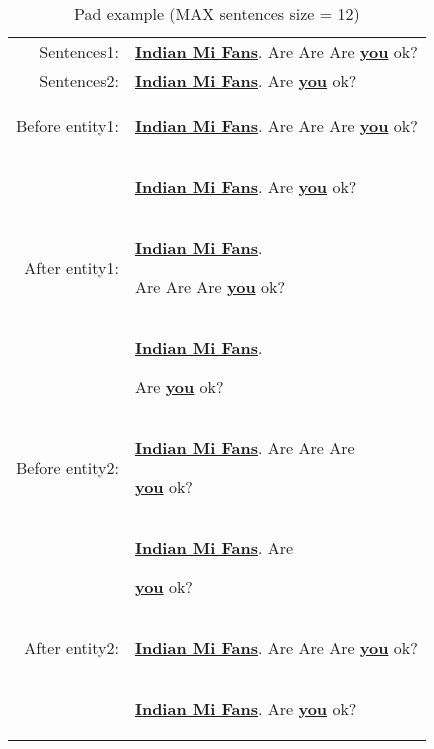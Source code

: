 \begin{table*}[htbp!] %
    \centering
    \begin{tabular}{rl}
    \midrule
        Sentences1:     &\textbf{\underline{Indian Mi Fans}}. Are Are Are \textbf{\underline{you}} ok? \\
        Sentences2:     &\textbf{\underline{Indian Mi Fans}}. Are \textbf{\underline{you}} ok? \\ 
        Before entity1: &\begin{scriptsize}[PAD] [PAD] \end{scriptsize} \textbf{\underline{Indian Mi Fans}}.  Are Are Are \textbf{\underline{you}} ok? \\
                        &\begin{scriptsize}[PAD] [PAD] [PAD] [PAD] \end{scriptsize}  \textbf{\underline{Indian Mi Fans}}. Are \textbf{\underline{you}} ok? \\
        After entity1:  &\textbf{\underline{Indian Mi Fans}}. \begin{scriptsize}[PAD] [PAD] \end{scriptsize} Are Are Are \textbf{\underline{you}} ok?\\
                        &\textbf{\underline{Indian Mi Fans}}. \begin{scriptsize}[PAD] [PAD] [PAD] [PAD] \end{scriptsize}  Are \textbf{\underline{you}} ok?\\
        Before entity2: &\textbf{\underline{Indian Mi Fans}}.  Are Are Are \begin{scriptsize}[PAD] [PAD] \end{scriptsize} \textbf{\underline{you}} ok? \\
                        &\textbf{\underline{Indian Mi Fans}}. Are \begin{scriptsize}[PAD] [PAD] [PAD] [PAD] \end{scriptsize}  \textbf{\underline{you}} ok? \\
        After entity2:  &\textbf{\underline{Indian Mi Fans}}. Are Are Are \textbf{\underline{you}} ok? \begin{scriptsize}[PAD] [PAD] \end{scriptsize} \\
                        &\textbf{\underline{Indian Mi Fans}}. Are \textbf{\underline{you}} ok? \begin{scriptsize}[PAD] [PAD] [PAD] [PAD] \end{scriptsize}  \\
    \bottomrule
    \end{tabular}
\caption{Pad example (MAX sentences size = 12)}
\label{tab:model}
\end{table*}